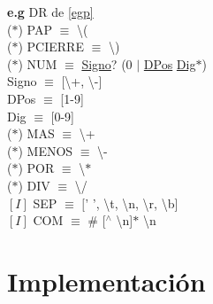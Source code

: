 \documentclass[\main/Apuntes_PL.tex]{subfiles}
\begin{document}
      \bigskip
      \par \noindent
      \textbf{e.g}  DR de \cref{egp}\\
      \hspace{5mm}($\ast$) PAP $\equiv$ \textbackslash( \\
      \hspace{5mm}($\ast$) PCIERRE $\equiv$ \textbackslash) \\
      \hspace{5mm}($\ast$) NUM $\equiv$ \underline{Signo}? (0 $\mid$ \underline{DPos} \underline{Dig}$\ast$) \\
      \hspace{10mm} Signo $\equiv$ [\textbackslash+, \textbackslash-] \\
      \hspace{10mm} DPos  $\equiv$ [1-9] \\
      \hspace{10mm} Dig   $\equiv$ [0-9] \\
      \hspace{5mm}($\ast$) MAS $\equiv$ \textbackslash + \\
      \hspace{5mm}($\ast$) MENOS $\equiv$ \textbackslash - \\
      \hspace{5mm}($\ast$) POR $\equiv$ \textbackslash $\ast$ \\
      \hspace{5mm}($\ast$) DIV $\equiv$ \textbackslash / \\
      \hspace{5mm}$[I]$ SEP $\equiv$ $[$' ', \textbackslash t, \textbackslash n, \textbackslash r, \textbackslash b]\\
      \hspace{5mm}$[I]$ COM $\equiv$ \# [$^\wedge$ \textbackslash n]$\ast$ \textbackslash n

  \section{Implementación}
\end{document}
